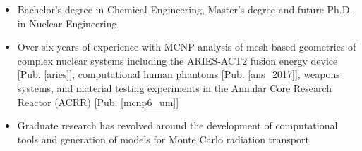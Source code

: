 \documentclass[a4paper,10pt]{article}
\begin{document}
\begin{itemize}[leftmargin=.9in,rightmargin=.875in,itemsep=1.6mm]

               \item Bachelor's degree in Chemical Engineering, Master's degree
		       and future Ph.D. in Nuclear Engineering
                \item Over six years of experience with MCNP analysis of
			mesh-based geometries of complex nuclear
		      systems including the ARIES-ACT2 fusion energy device
		      [Pub. \ref{aries}],
		      computational human phantoms
		      [Pub. \ref{ans_2017}], weapons systems, and material testing
		      experiments in the
		      Annular Core Research Reactor (ACRR) [Pub.
		      \ref{mcnp6_um}]
	       \item Graduate research has revolved around the development of
		       computational tools 
		       and generation of models for Monte Carlo radiation transport

\end{itemize}
\end{document}
